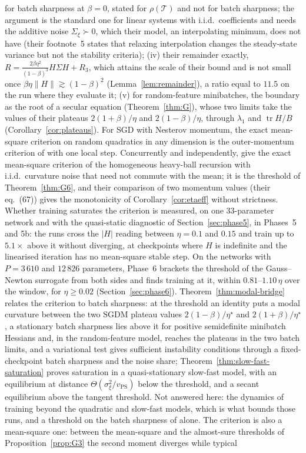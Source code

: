 \documentclass[11pt]{article}
\theoremstyle{remark}
\newcommand{\tr}{\operatorname{tr}}
\begin{document}
\citet{andreyev2024eoss} for batch sharpness at $\beta=0$, stated for $\rho(\mathcal T)$ and not for batch sharpness; the argument is the standard one for linear systems with i.i.d.\ coefficients \citep{costa2005mjls} and needs the additive noise $\Sigma_\xi\succ0$, which their model, an interpolating minimum, does not have (their footnote~5 states that relaxing interpolation changes the steady-state variance but not the stability criteria); (iv) their remainder exactly, $R=\frac{2\beta\eta^2}{(1-\beta)^3}H\Sigma H+R_3$, which attains the scale of their bound and is not small once $\beta\eta\|H\|\gtrsim(1-\beta)^2$ (Lemma~\ref{lem:remainder}), a ratio equal to $11.5$ on the run where they evaluate it; (v) for random-feature minibatches, the boundary as the root of a secular equation (Theorem~\ref{thm:G}), whose two limits take the values of their plateaus $2(1+\beta)/\eta$ and $2(1-\beta)/\eta$, through $\lambda_1$ and $\tr H/B$ (Corollary~\ref{cor:plateaus}). For SGD with Nesterov momentum, the exact mean-square criterion on random quadratics in any dimension is the outer-momentum criterion of \citet[Theorem~1]{sharma2026outer} with one local step. Concurrently and independently, \citet[Theorem~F.1]{cai2026llm} give the exact mean-square criterion of the homogeneous heavy-ball recursion with i.i.d.\ curvature noise that need not commute with the mean; it is the threshold of Theorem~\ref{thm:G6}, and their comparison of two momentum values (their eq.~(67)) gives the monotonicity of Corollary~\ref{cor:etaeff} without strictness. Whether training saturates the criterion is measured, on one $33$-parameter network and with the quasi-static diagnostic of Section~\ref{sec:phase5}, in Phases~5 and 5b: the runs cross the $|H|$ reading between $\eta=0.1$ and $0.15$ and train up to $5.1\times$ above it without diverging, at checkpoints where $H$ is indefinite and the linearised iteration has no mean-square stable step. On the networks with $P=3\,610$ and $12\,826$ parameters, Phase~6 brackets the threshold of the Gauss--Newton surrogate from both sides and finds training at it, within $0.81$--$1.10\,\eta$ over the window, for $\eta\ge0.02$ (Section~\ref{sec:phase6}). Theorem~\ref{thm:modal-bridge} relates the criterion to batch sharpness: at the threshold an identity puts a modal curvature between the two SGDM plateau values $2(1-\beta)/\eta^\star$ and $2(1+\beta)/\eta^\star$, a stationary batch sharpness lies above it for positive semidefinite minibatch Hessians and, in the random-feature model, reaches the plateaus in the two batch limits, and a variational test gives sufficient instability conditions through a fixed-checkpoint batch sharpness and the noise share; Theorem~\ref{thm:slow-fast-saturation} proves saturation in a quasi-stationary slow-fast model, with an equilibrium at distance $\Theta(\sigma_\xi^2/v_{\mathrm{PS}})$ below the threshold, and a secant equilibrium above the tangent threshold. Not answered here: the dynamics of training beyond the quadratic and slow-fast models, which is what bounds those runs, and a threshold on the batch sharpness of \citet[Definition~3.1]{andreyev2026momentum} alone. The criterion is also a mean-square one: between the mean-square and the almost-sure thresholds of Proposition~\ref{prop:G3} the second moment diverges while typical 
\end{document}
